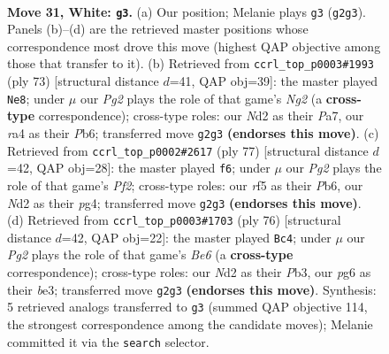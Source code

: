 \documentclass[11pt]{article}
\begin{document}
\clearpage

\begin{figure}[p]\centering
\begin{subfigure}{0.46\textwidth}\centering
\resizebox{\linewidth}{!}{%
\newchessgame
\chessboard[
  setfen={8/1R3pk1/2p3p1/2P2r1p/r6P/8/P2N2PK/2B5 w - - 0 31},
  showmover=false,
  pgfstyle=straightmove, color=movearrow, markmove={g2-g3}
]}
\caption{}
\end{subfigure}\hfill
\begin{subfigure}{0.46\textwidth}\centering
\resizebox{\linewidth}{!}{%
\newchessgame
\chessboard[
  setfen={6k1/p4pn1/1p5p/4P3/1P6/2N2R1P/3r2PK/8 b - - 0 37},
  showmover=false,
  pgfstyle=straightmove, color=movearrow, markmove={g7-e8}
]}
\caption{}
\end{subfigure}
\\[4pt]
\begin{subfigure}{0.46\textwidth}\centering
\resizebox{\linewidth}{!}{%
\newchessgame
\chessboard[
  setfen={8/5pk1/pp5p/3p3R/P5P1/2P4P/KP1r4/8 b - - 1 39},
  showmover=false,
  pgfstyle=straightmove, color=movearrow, markmove={f7-f6}
]}
\caption{}
\end{subfigure}\hfill
\begin{subfigure}{0.46\textwidth}\centering
\resizebox{\linewidth}{!}{%
\newchessgame
\chessboard[
  setfen={8/2R2pk1/1p2B1p1/8/Pp1p1r1P/1P2bP2/6K1/8 w - - 1 39},
  showmover=false,
  pgfstyle=straightmove, color=movearrow, markmove={e6-c4}
]}
\caption{}
\end{subfigure}
\caption{\textbf{Move 31, White: \texttt{g3}.} (a) Our position; Melanie plays \texttt{g3} (\texttt{g2g3}). Panels (b)--(d) are the retrieved master positions whose correspondence most drove this move (highest QAP objective among those that transfer to it). (b) Retrieved from \texttt{ccrl\_top\_p0003\#1993} (ply 73) [structural distance $d$=41, QAP obj=39]: the master played \texttt{Ne8}; under $\mu$ our \emph{Pg2} plays the role of that game's \emph{Ng2} (a \textbf{cross-type} correspondence); cross-type roles: our \emph{N}d2 as their \emph{P}a7, our \emph{r}a4 as their \emph{P}b6; transferred move \texttt{g2g3} \textbf{(endorses this move)}. (c) Retrieved from \texttt{ccrl\_top\_p0002\#2617} (ply 77) [structural distance $d$=42, QAP obj=28]: the master played \texttt{f6}; under $\mu$ our \emph{Pg2} plays the role of that game's \emph{Pf2}; cross-type roles: our \emph{r}f5 as their \emph{P}b6, our \emph{N}d2 as their \emph{p}g4; transferred move \texttt{g2g3} \textbf{(endorses this move)}. (d) Retrieved from \texttt{ccrl\_top\_p0003\#1703} (ply 76) [structural distance $d$=42, QAP obj=22]: the master played \texttt{Bc4}; under $\mu$ our \emph{Pg2} plays the role of that game's \emph{Be6} (a \textbf{cross-type} correspondence); cross-type roles: our \emph{N}d2 as their \emph{P}b3, our \emph{p}g6 as their \emph{b}e3; transferred move \texttt{g2g3} \textbf{(endorses this move)}. Synthesis: 5 retrieved analogs transferred to \texttt{g3} (summed QAP objective 114, the strongest correspondence among the candidate moves); Melanie committed it via the \texttt{search} selector.}
\label{fig:thought-m60}
\end{figure}
\end{document}

